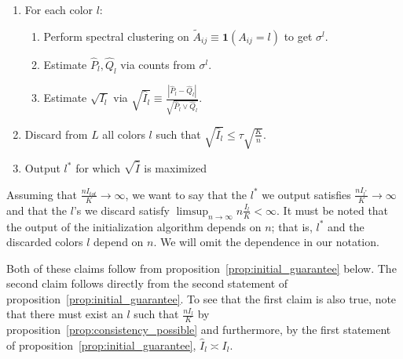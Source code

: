 \documentclass{article}
\begin{document}
\begin{enumerate}
\item For each color $l$:
  \begin{enumerate}
   \item Perform spectral clustering on $\tilde{A}_{ij} \equiv \mathbf{1}(A_{ij} = l)$ to get $\sigma^l$. 
   \item Estimate $\hat{P}_l, \hat{Q}_l$ via counts from $\sigma^l$. 
   \item Estimate $\sqrt{I_l}$ via 
  $\sqrt{ \hat{I}_l } \equiv \frac{| \hat{P}_l - \hat{Q}_l |}{\sqrt{ \hat{P}_l \vee \hat{Q}_l}}$. 
   \end{enumerate}
\item Discard from $L$ all colors $l$ such that $\sqrt{\hat{I}_l} \leq \tau \sqrt{ \frac{K}{n}}$.
\item Output $l^*$ for which $\sqrt{\hat{I}}$ is maximized
\end{enumerate}

Assuming that $ \frac{n I_{tot}}{K} \rightarrow \infty$, we want to say that the $l^*$ we output satisfies $\frac{n I_{l^*}}{K} \rightarrow \infty $ and that the $l$'s we discard satisfy $\limsup_{n \rightarrow \infty} n \frac{I_l}{K} < \infty$. It must be noted that the output of the initialization algorithm depends on $n$; that is, $l^*$ and the discarded colors $l$ depend on $n$. We will omit the dependence in our notation. 


Both of these claims follow from proposition~\ref{prop:initial_guarantee} below. The second claim follows directly from the second statement of proposition~\ref{prop:initial_guarantee}. To see that the first claim is also true, note that there must exist an $l$ such that $\frac{n I_l}{K}$ by proposition~\ref{prop:consistency_possible} and furthermore, by the first statement of proposition~\ref{prop:initial_guarantee}, $\hat{I}_{l} \asymp I_{l}$. 
\end{document}
